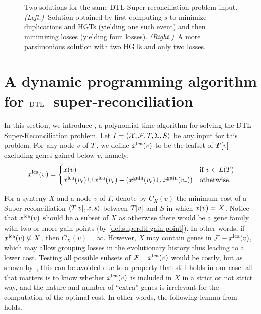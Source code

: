 \begin{figure}[htb]
    \capstart
    \centering%
    \hspace{6em}%
    \caption[Counter-example to the two-step approach for solving SuperDTL]{
        Two solutions for the same DTL Super-reconciliation problem input.
        \emph{(Left.)}~Solution obtained by first computing \(s\) to minimize duplications and HGTs (yielding one such event) and then minimizing losses (yielding four~losses).
        \emph{(Right.)}~A more parsimonious solution with two HGTs and only two losses.
        \label{fig:superdtl:2-steps-ct-ex}
    }
\end{figure}

\section{A dynamic programming algorithm for \(\mathrm{DTL}\)~super-reconciliation}\label{sec:superdtl:algo}

In this section, we introduce {\superdtl}, a polynomial-time algorithm for solving the DTL Super-Reconciliation problem.
Let \(I = \left\langle\mathcal{X}, \mathcal{F}, T, \Sigma, S\right\rangle\) be any input for this problem.
For any node \(v\) of \(T\), we define \(x^{\mathrm{lca}}(v)\) to be the leafset of \(T[v]\) excluding genes gained below \(v\), namely: \[
    x^{\mathrm{lca}}(v) = \begin{cases}
        x(v) & \text{if } v \in L(T)\\
        x^{\mathrm{lca}}(v_\mathit{\ell}) \cup x^{\mathrm{lca}}(v_r) - (x^{\mathrm{gain}}(v_\mathit{\ell}) \cup x^{\mathrm{gain}}(v_r))& \text{otherwise.}
    \end{cases}
\]

For a synteny \(X\) and a node \(v\) of \(T\), denote by \(C_X(v)\) the minimum cost of a Super-reconciliation \(\left\langle T[v], x, s\right\rangle\) between \(T[v]\) and \(S\) in which \(x(v) = X\). Notice that \(x^{\mathrm{lca}}(v)\) should be a subset of \(X\) as otherwise there would be a gene family with two or more gain points (by \cref{def:superdtl-gain-point}). In other words, if \(x^{\mathrm{lca}}(v) \not\subseteq X\), then \(C_X(v)=\infty\). However, \(X\) may contain genes in \(\mathcal{F} - x^{\mathrm{lca}}(v)\), which may allow grouping losses in the evolutionary history thus leading to a lower cost. Testing all possible subsets of \(\mathcal{F} - x^{\mathrm{lca}}(v)\) would be costly, but as shown by~\textcite{Delabre2020EvolutionSegmentalDuplications}, this can be avoided due to a property that still holds in our case: all that matters is to know whether \(x^{\mathrm{lca}}(v)\) is included in \(X\) in a strict or not strict way, and the nature and number of \enquote{extra} genes is irrelevant for the computation of the optimal cost. In other words, the following lemma from~\textcite{Delabre2020EvolutionSegmentalDuplications} holds.

